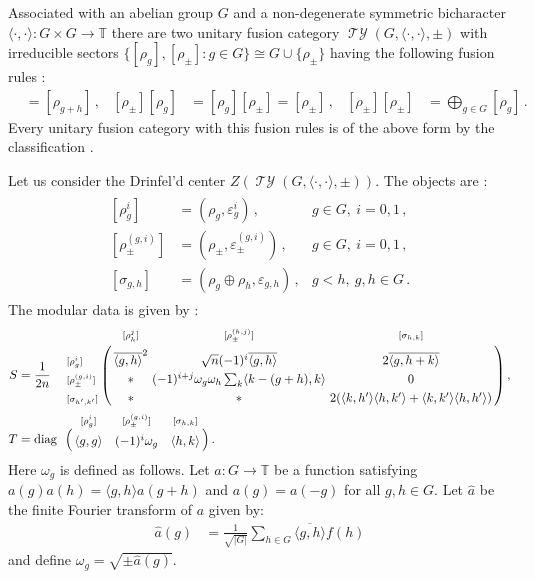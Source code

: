 \documentclass[twoside,11pt,reqno]{amsart}
\theoremstyle{definition}
\theoremstyle{remark}
\newcommand{\TT}{\mathbb{T}}
\DeclareMathOperator{\diag}{diag}
\DeclareMathOperator*{\TY}{\mathcal{TY}}
\newcommand{\bi}[2]{\langle #1,#2\rangle}
\newcommand{\hb}{\varepsilon} %
\newcommand{\bislotslot}{\bi\cdot\cdot}
\begin{document}
Associated with an abelian group $G$ and a non-degenerate symmetric bicharacter
$\bislotslot\colon G\times G \to \TT$ there are two unitary fusion category 
$\TY(G,\bislotslot,\pm)$ with irreducible sectors 
$\{[\rho_g],[\rho_\pm]:g\in G\}\cong G\cup\{\rho_\pm\}$ having the following 
fusion rules \cite{Iz2001II}: 
\begin{align}
  [\rho_g][\rho_h]&=[\rho_{g+h}]\,,&
  [\rho_\pm][\rho_g]&=[\rho_g][\rho_\pm]=[\rho_\pm]\,, &
  [\rho_\pm][\rho_\pm] &= \bigoplus_{g\in G}[\rho_g]\,.
\end{align}
Every unitary fusion category with this 
fusion rules is of the above form by the classification \cite{TaYa1998}.
%

Let us consider the Drinfel'd center $Z(\TY(G,\bislotslot,\pm))$. 
The objects are \cite{Iz2001II}:
\begin{gather}
  \label{eq:TYobjs}
  \begin{aligned}
  [\rho_g^i]&=(\rho_g,\hb_g^i)\,, & g\in G,\ i=0,1\,,\\
  [\rho_\pm^{(g,i)}]&=(\rho_\pm,\hb_\pm^{(g,i)})\,, & g\in G,~i=0,1\,,\\
  [\sigma_{g,h}]&=(\rho_g\oplus\rho_h,\hb_{g,h})\,, &g<h,~g,h \in G\,.
  \end{aligned}
\end{gather}
The modular data is given by \cite{Iz2001II}:
\begin{subequations}
%
\label{eq:TYMD}
%
\begin{align}
  \label{eq:TYS}
  S&=\frac1{2n}\quad
  \bordermatrix{
    &\scriptstyle[\rho^j_h] & \scriptstyle[\rho_\pm^{(h,j)}] &\scriptstyle[\sigma_{h,k}]\cr
    \scriptstyle[\rho^i_g] &\overline{\bi gh}^2&\sqrt n (-1)^i\overline{\bi gh}&2 \overline{\bi g{h+k}}\cr
    \scriptstyle[\rho_\pm^{(g,i)}]&\ast &\!\!\!\!(-1)^{i+j}\omega_g\omega_h\sum_k\bi{k-(g+h)}k\!\!\!\!&0\cr
    \scriptstyle[\sigma_{h',k'}]&\ast&\ast &2(\bi k{h'}\bi h{k'}+\bi k{k'}\bi h{h'})
  }\,,
  \\
  \label{eq:TYT}
  T&=\diag 
  \bordermatrix{
    & \scriptstyle[\rho^i_g] & \scriptstyle[\rho_\pm^{(g,i)}] &\scriptstyle[\sigma_{h,k}]\cr
    \!\!\!\! &\bi gg & (-1)^i\omega_g & \bi hk
  }
  \,.
\end{align}
\end{subequations}
%
%
Here $\omega_g$ is defined as follows. 
Let $a\colon G\to \TT$ be a function satisfying $a(g)a(h)=\bi gh a(g+h)$ and 
$a(g)=a(-g)$ for all $g,h\in G$. 
Let $\hat a$ be the finite Fourier transform of $a$ given by:
\begin{align} 
  \hat a(g)&=\frac{1}{\sqrt{|G|}}\sum_{h\in G}\overline{\bi gh} f(h)
\end{align}
and define $\omega_g=\sqrt{\pm\hat a(g)}$.
\end{document}
